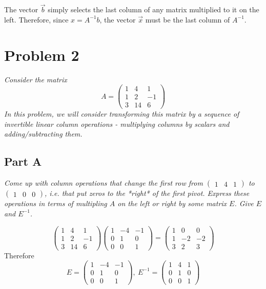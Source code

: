 \documentclass{article}
\begin{document}
The vector $ \vec{b} $ simply selects the last column of any matrix multiplied
to it on the left. Therefore, since $ x = A^{-1} b $, the vector $ \vec{x} $
must be the last column of $ A^{-1} $.

\section*{Problem 2}

\textit{Consider the matrix}
\[
    A = \begin{pmatrix}
        1 & 4 & 1 \\
        1 & 2 & -1 \\
        3 & 14 & 6
    \end{pmatrix}
\]
\textit{In this problem, we will consider transforming this matrix by a sequence
of invertible linear column operations - multiplying columns by scalars and
adding/subtracting them.}

\subsection*{Part A}

\textit{Come up with column operations that change the first row from
$\begin{pmatrix} 1 & 4 & 1\end{pmatrix}$ to $\begin{pmatrix} 1 & 0 &
0\end{pmatrix}$, i.e. that put zeros to the *right* of the first pivot. Express
these operations in terms of multipling $A$ on the left or right by some matrix
$E$. Give $E$ and $E^{-1}$.}

\bigbreak

\[
    \begin{pmatrix}
        1 & 4 & 1 \\
        1 & 2 & -1 \\
        3 & 14 & 6
    \end{pmatrix}
    \begin{pmatrix}
        1 & -4 & -1 \\
        0 & 1 & 0 \\
        0 & 0 & 1
    \end{pmatrix}
    =
    \begin{pmatrix}
        1 & 0 & 0 \\
        1 & -2 & -2 \\
        3 & 2 & 3
    \end{pmatrix}
\]
Therefore
\[
    E = \begin{pmatrix}
        1 & -4 & -1 \\
        0 & 1 & 0 \\
        0 & 0 & 1
    \end{pmatrix},
    \ E^{-1} = \begin{pmatrix}
        1 & 4 & 1 \\
        0 & 1 & 0 \\
        0 & 0 & 1
    \end{pmatrix}
\]
\end{document}
